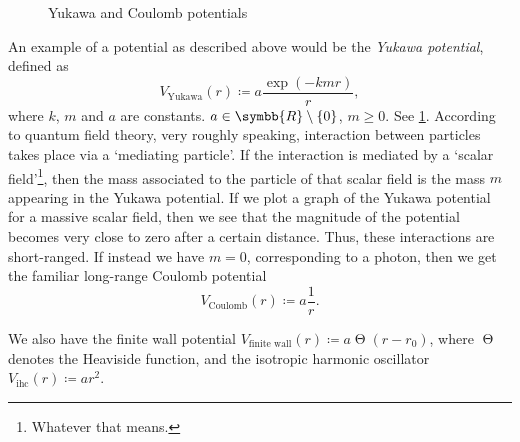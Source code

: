 \documentclass[12pt, a4 paper]{article}
\theoremstyle{definition}
\newcommand{\rr}{\symbb{R}}
\newcommand{\e}{\symrm{e}}
\begin{document}
    \begin{figure}[h]
        \centering
        \caption{Yukawa and Coulomb potentials}\label{fig:potential}
    \end{figure}
    An example of a potential as described above would be the \textit{Yukawa potential}, defined as
    \[
        V_{\text{Yukawa}}(r) \coloneq a \frac{\exp({-kmr})}{r},
    \]
    where $k$, $m$ and $a$ are constants. $a \in \rr \setminus \{0\}$, $m \geq 0$. See \cref{fig:potential}. According to quantum field theory, very roughly speaking, interaction between particles takes place via a `mediating particle'. If the interaction is mediated by a `scalar field'\footnote{Whatever that means.}, then the mass associated to the particle of that scalar field is the mass $m$ appearing in the Yukawa potential. If we plot a graph of the Yukawa potential for a massive scalar field, then we see that the magnitude of the potential becomes very close to zero after a certain distance. Thus, these interactions are short-ranged. If instead we have $m = 0$, corresponding to a photon, then we get the familiar long-range Coulomb potential
    \[
        V_{\text{Coulomb}}(r) \coloneq a \frac{1}{r}.
    \]

    We also have the finite wall potential $V_{\text{finite wall}}(r) \coloneq a \upTheta(r - r_0)$, where \(\upTheta\) denotes the Heaviside function, and the isotropic harmonic oscillator $V_{\text{ihc}} (r) \coloneq a r^2$.
\end{document}
